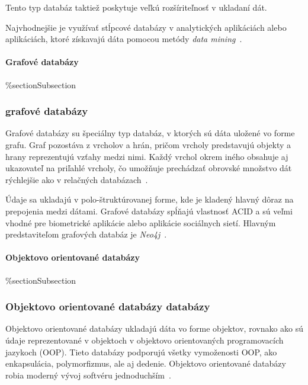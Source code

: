 Tento typ databáz taktiež poskytuje veľkú rozšíriteľnosť v ukladaní dát.

Najvhodnejšie je využívať stĺpcové databázy v analytických aplikáciách alebo aplikáciách, ktoré získavajú dáta pomocou metódy \textit{data mining}~\cite{NoSQLDBvsRealtionDB}.

%
%
{
	\paragraph{Grafové databázy}
}
{
	\%section{Subsection}
	\subsubsection{grafové databázy}
}
\label{subsubsection:graph_db}
Grafové databázy su špeciálny typ databáz, v ktorých sú dáta uložené vo forme grafu. Graf pozostáva z vrcholov a hrán, pričom vrcholy predstavujú objekty a hrany reprezentujú vzťahy medzi nimi. Každý vrchol okrem iného obsahuje aj ukazovateľ na priľahlé vrcholy, čo umožňuje prechádzať obrovské množstvo dát rýchlejšie ako v relačných databázach~\cite{NoSQLDBvsRealtionDB}.

Údaje sa ukladajú v polo-štruktúrovanej forme, kde je kladený hlavný dôraz na prepojenia medzi dátami. Grafové databázy spĺňajú vlastnosť ACID a sú veľmi vhodné pre biometrické aplikácie alebo aplikácie sociálnych sietí. Hlavným predstaviteľom grafových databáz je \textit{Neo4j}~\cite{NoSQLDBvsRealtionDB}.

%
%
{
	\paragraph{Objektovo orientované databázy}
}
{
	\%section{Subsection}
	\subsubsection{Objektovo orientované databázy databázy}
}
\label{subsubsection:object_oriented_db}
Objektovo orientované databázy ukladajú dáta vo forme objektov, rovnako ako sú údaje reprezentované v objektoch v objektovo orientovaných programovacích jazykoch (OOP). Tieto databázy podporujú všetky vymoženosti OOP, ako enkapsulácia, polymorfizmus, ale aj dedenie. Objektovo orientované databázy robia moderný vývoj softvéru jednoduchším~\cite{NoSQLDBvsRealtionDB}.

